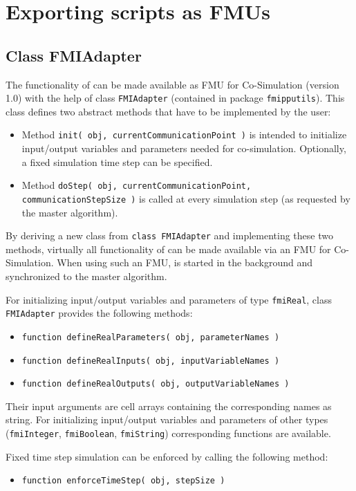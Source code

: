 \chapter{Exporting \matlab scripts as FMUs}

\section{Class FMIAdapter}

The functionality of \matlab can be made available as FMU for Co-Simulation (version 1.0) with the help of class \texttt{FMIAdapter} (contained in package \texttt{fmipputils}).
This class defines two abstract methods that have to be implemented by the user:
\begin{itemize}

  \item Method \texttt{init( obj, currentCommunicationPoint )} is intended to initialize input/output variables and parameters needed for co-simulation.
  Optionally, a fixed simulation time step can be specified.

  \item Method \texttt{doStep(  obj, currentCommunicationPoint, communicationStepSize )} is called at every simulation step (as requested by the master algorithm).
\end{itemize}
By deriving a new class from \texttt{class FMIAdapter} and implementing these two methods, virtually all functionality of \matlab can be made available via an FMU for Co-Simulation.
When using such an FMU, \matlab is started in the background and synchronized to the master algorithm.

For initializing input/output variables and parameters of type \texttt{fmiReal}, class \texttt{FMIAdapter} provides the following methods:
\begin{itemize}
  \item \texttt{function defineRealParameters( obj, parameterNames )}
  \item \texttt{function defineRealInputs( obj, inputVariableNames )}
  \item \texttt{function defineRealOutputs( obj, outputVariableNames )}
\end{itemize}
Their input arguments are cell arrays containing the corresponding names as string.
For initializing input/output variables and parameters of other types (\texttt{fmiInteger}, \texttt{fmiBoolean}, \texttt{fmiString}) corresponding functions are available.

Fixed time step simulation can be enforced by calling the following method:
\begin{itemize}
  \item \texttt{function enforceTimeStep( obj, stepSize )}
\end{itemize}

